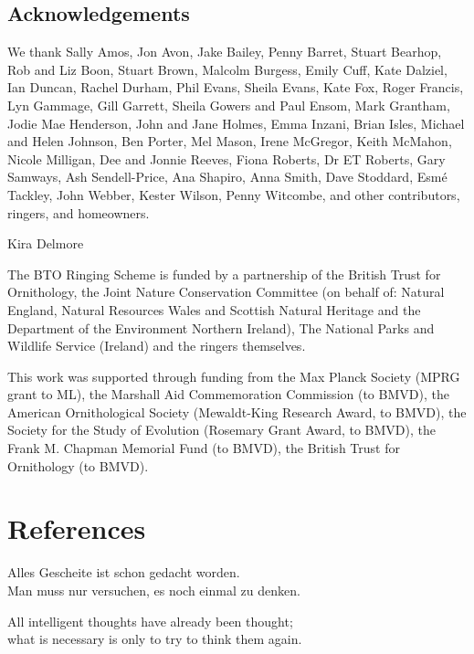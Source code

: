 \documentclass[a4paper, twoside]{templates/ociamthesis}
\begin{document}
\hypertarget{acknowledgements-1}{%
\subsection{Acknowledgements}\label{acknowledgements-1}}

We thank Sally Amos, Jon Avon, Jake Bailey, Penny Barret, Stuart Bearhop, Rob and Liz Boon, Stuart Brown, Malcolm Burgess, Emily Cuff, Kate Dalziel, Ian Duncan, Rachel Durham, Phil Evans, Sheila Evans, Kate Fox, Roger Francis, Lyn Gammage, Gill Garrett, Sheila Gowers and Paul Ensom, Mark Grantham, Jodie Mae Henderson, John and Jane Holmes, Emma Inzani, Brian Isles, Michael and Helen Johnson, Ben Porter, Mel Mason, Irene McGregor, Keith McMahon, Nicole Milligan, Dee and Jonnie Reeves, Fiona Roberts, Dr ET Roberts, Gary Samways, Ash Sendell-Price, Ana Shapiro, Anna Smith, Dave Stoddard, Esmé Tackley, John Webber, Kester Wilson, Penny Witcombe, and other contributors, ringers, and homeowners.

Kira Delmore

The BTO Ringing Scheme is funded by a partnership of the British Trust for Ornithology, the Joint Nature Conservation Committee (on behalf of: Natural England, Natural Resources Wales and Scottish Natural Heritage and the Department of the Environment Northern Ireland), The National Parks and Wildlife Service (Ireland) and the ringers themselves.

This work was supported through funding from the Max Planck Society (MPRG grant to ML), the Marshall Aid Commemoration Commission (to BMVD), the American Ornithological Society (Mewaldt-King Research Award, to BMVD), the Society for the Study of Evolution (Rosemary Grant Award, to BMVD), the Frank M. Chapman Memorial Fund (to BMVD), the British Trust for Ornithology (to BMVD).

\hypertarget{references-1}{%
\section{References}\label{references-1}}

\hypertarget{refs}{}

\begin{savequote}
Alles Gescheite ist schon gedacht worden.\\
Man muss nur versuchen, es noch einmal zu denken.

All intelligent thoughts have already been thought;\\
what is necessary is only to try to think them again.
\end{savequote}
\end{document}
